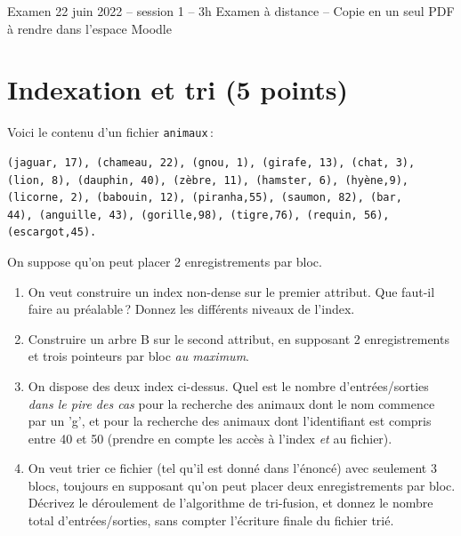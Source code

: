 %
{Examen 22 juin 2022 -- session 1 -- 3h}%
{Examen à distance -- Copie en un seul PDF à rendre dans l'espace Moodle}%


\section{Indexation et tri (5 points)}

Voici le contenu d'un fichier \texttt{animaux}\,:

\begin{verbatim}
(jaguar, 17), (chameau, 22), (gnou, 1), (girafe, 13), (chat, 3),
(lion, 8), (dauphin, 40), (zèbre, 11), (hamster, 6), (hyène,9),
(licorne, 2), (babouin, 12), (piranha,55), (saumon, 82), (bar,
44), (anguille, 43), (gorille,98), (tigre,76), (requin, 56), (escargot,45).
\end{verbatim}

On suppose qu'on peut placer  2 enregistrements par bloc. 

\begin{enumerate}
  \item On veut construire un index non-dense sur le premier attribut.
    Que faut-il faire au préalable\,? Donnez les différents niveaux de l'index.
 
  \item Construire un arbre B sur le second attribut, 
     en supposant 2 enregistrements et trois pointeurs par bloc \emph{au maximum}.

  \item On dispose des deux index ci-dessus. Quel est le 
     nombre d'entrées/sorties \emph{dans le pire des cas}
     pour la recherche des animaux dont le nom commence par un 'g',
     et pour la recherche des animaux dont l'identifiant est compris
    entre 40 et 50 (prendre en compte les accès à l'index \emph{et}
    au fichier).

  \item On veut trier ce fichier (tel qu'il est donné dans l'énoncé)
     avec seulement 3 blocs, toujours
    en supposant qu'on peut placer deux enregistrements par bloc.
    Décrivez le déroulement de l'algorithme de tri-fusion, 
   et donnez le nombre total d'entrées/sorties, sans compter
    l'écriture finale du fichier trié. 
\end{enumerate}

